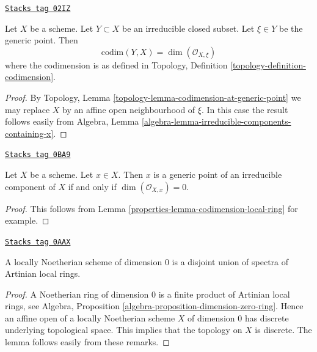 \begin{lemma}
\label{properties-lemma-codimension-local-ring}
\href{https://stacks.math.columbia.edu/tag/02IZ}{\texttt{Stacks tag 02IZ}}

Let $X$ be a scheme. Let $Y \subset X$ be an irreducible closed
subset. Let $\xi \in Y$ be the generic point. Then
$$
\text{codim}(Y, X) = \dim(\mathcal{O}_{X, \xi})
$$
where the codimension is as defined in
Topology, Definition \ref{topology-definition-codimension}.
\end{lemma}

\begin{proof}
By Topology, Lemma \ref{topology-lemma-codimension-at-generic-point}
we may replace $X$ by an affine open neighbourhood of $\xi$. In this
case the result follows easily from
Algebra, Lemma \ref{algebra-lemma-irreducible-components-containing-x}.
\end{proof}

\begin{lemma}
\label{properties-lemma-generic-point}
\href{https://stacks.math.columbia.edu/tag/0BA9}{\texttt{Stacks tag 0BA9}}

Let $X$ be a scheme. Let $x \in X$. Then $x$ is a generic point of
an irreducible component of $X$ if and only if $\dim(\mathcal{O}_{X, x}) = 0$.
\end{lemma}

\begin{proof}

This follows from Lemma \ref{properties-lemma-codimension-local-ring} for example.
\end{proof}

\begin{lemma}
\label{properties-lemma-locally-Noetherian-dimension-0}
\href{https://stacks.math.columbia.edu/tag/0AAX}{\texttt{Stacks tag 0AAX}}

A locally Noetherian scheme of dimension $0$ is a disjoint
union of spectra of Artinian local rings.
\end{lemma}

\begin{proof}
A Noetherian ring of dimension $0$ is a finite product of Artinian local
rings, see
Algebra, Proposition \ref{algebra-proposition-dimension-zero-ring}.
Hence an affine open of a locally Noetherian scheme $X$ of dimension
$0$ has discrete underlying topological space. This implies that
the topology on $X$ is discrete. The lemma follows easily from these
remarks.
\end{proof}


